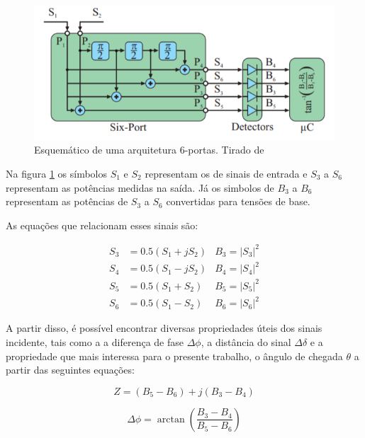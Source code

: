 \begin{figure}[H]
	\centering 
	\includegraphics[scale = 1]{images/six_port_schematic.png}
	\caption{Esquemático de uma arquitetura 6-portas. Tirado de \cite{art15} }
	\label{fig:six_port_schematic}
\end{figure}

Na figura \ref{fig:six_port_schematic} os símbolos \( S_1 \) e \( S_2 \) representam os de sinais de entrada e \( S_3 \) a \( S_6 \) representam as potências medidas na saída. Já os simbolos de \( B_3 \) a \( B_6 \) representam as potências de \( S_3 \) a \( S_6 \) convertidas para tensões de base.

As equações que relacionam esses sinais são:

\begin{align*}
    S_3 & = 0.5(S_1 + jS_2) & B_3 = \left | S_3 \right | ^2\\
    S_4 & = 0.5(S_1 - jS_2) & B_4 = \left | S_4 \right | ^2\\
    S_5 & = 0.5(S_1 + S_2)  & B_5 = \left | S_5 \right | ^2\\
    S_6 & = 0.5(S_1 - S_2)  & B_6 = \left | S_6 \right | ^2
\end{align*}

A partir disso, é possível encontrar diversas propriedades úteis dos sinais incidente, tais como a a diferença de fase \( \Delta\phi\), a distância do sinal \( \Delta\delta\) e a propriedade que mais interessa para o presente trabalho, o ângulo de chegada \(\theta\) a partir das seguintes equações:

\begin{equation}
    Z = (B_5 - B_6) + j(B_3 - B_4)
    \end{equation}

\begin{equation}
    \Delta \phi = \arctan \left ( \frac{B_3-B_4}{B_5-B_6} \right )
    \end{equation}

